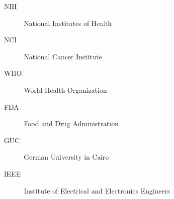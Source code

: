 \begin{description}
  \item[NIH] National Institutes of Health
  \item[NCI] National Cancer Institute
  \item[WHO] World Health Organization
  \item[FDA] Food and Drug Administration
  \item[GUC] German University in Cairo
  \item[IEEE] Institute of Electrical and Electronics Engineers
\end{description}
\clearpage
\listoffigures
{}
